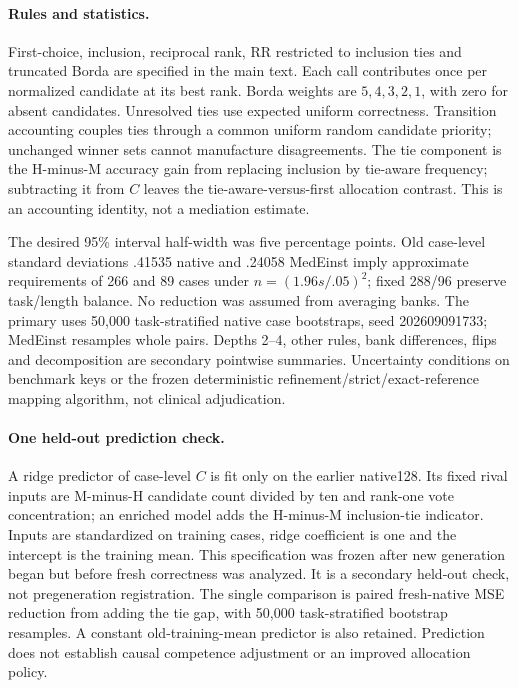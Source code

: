\paragraph{Rules and statistics.}
First-choice, inclusion, reciprocal rank, RR restricted to inclusion ties and truncated Borda are specified in the main text. Each call contributes once per normalized candidate at its best rank. Borda weights are $5,4,3,2,1$, with zero for absent candidates. Unresolved ties use expected uniform correctness. Transition accounting couples ties through a common uniform random candidate priority; unchanged winner sets cannot manufacture disagreements. The tie component is the H-minus-M accuracy gain from replacing inclusion by tie-aware frequency; subtracting it from $C$ leaves the tie-aware-versus-first allocation contrast. This is an accounting identity, not a mediation estimate.

The desired 95\% interval half-width was five percentage points. Old case-level standard deviations .41535 native and .24058 MedEinst imply approximate requirements of 266 and 89 cases under $n=(1.96s/.05)^2$; fixed 288/96 preserve task/length balance. No reduction was assumed from averaging banks. The primary uses 50,000 task-stratified native case bootstraps, seed 202609091733; MedEinst resamples whole pairs. Depths 2--4, other rules, bank differences, flips and decomposition are secondary pointwise summaries. Uncertainty conditions on benchmark keys or the frozen deterministic refinement/strict/exact-reference mapping algorithm, not clinical adjudication.

\paragraph{One held-out prediction check.}
A ridge predictor of case-level $C$ is fit only on the earlier native128. Its fixed rival inputs are M-minus-H candidate count divided by ten and rank-one vote concentration; an enriched model adds the H-minus-M inclusion-tie indicator. Inputs are standardized on training cases, ridge coefficient is one and the intercept is the training mean. This specification was frozen after new generation began but before fresh correctness was analyzed. It is a secondary held-out check, not pregeneration registration. The single comparison is paired fresh-native MSE reduction from adding the tie gap, with 50,000 task-stratified bootstrap resamples. A constant old-training-mean predictor is also retained. Prediction does not establish causal competence adjustment or an improved allocation policy.

